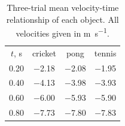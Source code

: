 \begin{table}
  \caption{Three-trial mean velocity-time relationship of each object. All velocities given in \unit{\meter\per\second}.}
  \label{tab:2}
  \begin{ruledtabular}
    \begin{tabular}{cccc}
      $t$, \unit{\second} & cricket & pong & tennis \\
      \colrule
      \num{0.20} & \num{-2.18} & \num{-2.08} & \num{-1.95} \\
      \num{0.40} & \num{-4.13} & \num{-3.98} & \num{-3.93} \\
      \num{0.60} & \num{-6.00} & \num{-5.93} & \num{-5.90} \\
      \num{0.80} & \num{-7.73} & \num{-7.80} & \num{-7.83} \\
    \end{tabular}
  \end{ruledtabular}
\end{table}
